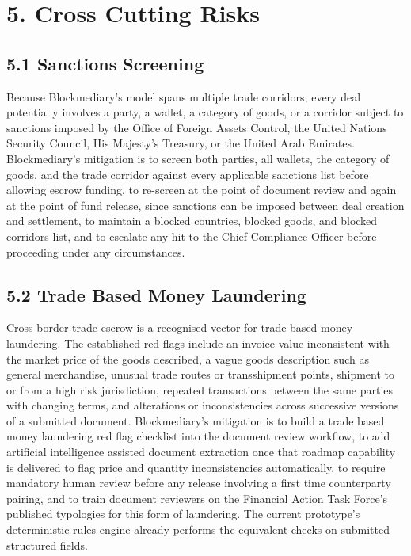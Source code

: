 \documentclass[12pt, a4paper]{article}
\begin{document}
\section*{5. Cross Cutting Risks}

\subsection*{5.1 Sanctions Screening}

Because Blockmediary's model spans multiple trade corridors, every deal potentially
involves a party, a wallet, a category of goods, or a corridor subject to sanctions
imposed by the Office of Foreign Assets Control, the United Nations Security Council, His
Majesty's Treasury, or the United Arab Emirates. Blockmediary's mitigation is to screen
both parties, all wallets, the category of goods, and the trade corridor against every
applicable sanctions list before allowing escrow funding, to re-screen at the point of
document review and again at the point of fund release, since sanctions can be imposed
between deal creation and settlement, to maintain a blocked countries, blocked goods, and
blocked corridors list, and to escalate any hit to the Chief Compliance Officer before
proceeding under any circumstances.

\subsection*{5.2 Trade Based Money Laundering}

Cross border trade escrow is a recognised vector for trade based money laundering. The
established red flags include an invoice value inconsistent with the market price of the
goods described, a vague goods description such as general merchandise, unusual trade
routes or transshipment points, shipment to or from a high risk jurisdiction, repeated
transactions between the same parties with changing terms, and alterations or
inconsistencies across successive versions of a submitted document. Blockmediary's
mitigation is to build a trade based money laundering red flag checklist into the document
review workflow, to add artificial intelligence assisted document extraction once that
roadmap capability is delivered to flag price and quantity inconsistencies automatically,
to require mandatory human review before any release involving a first time counterparty
pairing, and to train document reviewers on the Financial Action Task Force's published
typologies for this form of laundering. The current prototype's deterministic rules engine
already performs the equivalent checks on submitted structured fields.
\end{document}
